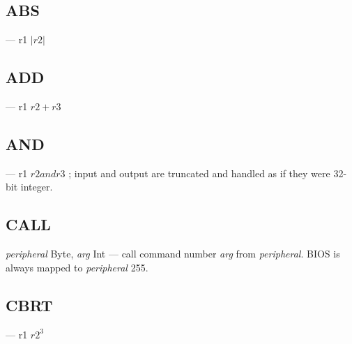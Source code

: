 \subsection{ABS} --- r1 \leftarrow $ |r2| $
\subsection{ADD} --- r1 \leftarrow $ r2 + r3 $
\subsection{AND} --- r1 \leftarrow $ r2 and r3 $ ; input and output are truncated and handled as if they were 32-bit integer.
\subsection{CALL} \emph{peripheral}\: Byte, \emph{arg}\: Int --- call command number \emph{arg} from \emph{peripheral}. BIOS is always mapped to \emph{peripheral} 255.
\subsection{CBRT} --- r1 \leftarrow $ r2 ^ 3 $

